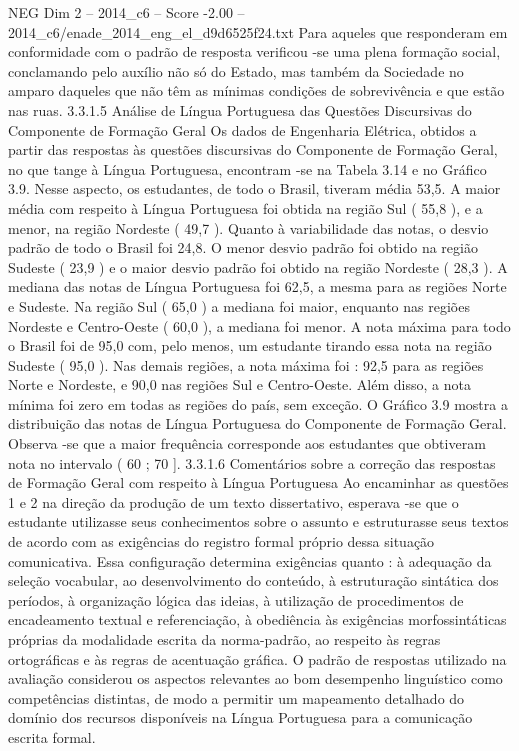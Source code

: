 \begin{textsample}{NEG Dim 2 – 2014\_c6 – Score -2.00 – 2014\_c6/enade\_2014\_eng\_el\_d9d6525f24.txt}
Para aqueles que responderam em conformidade com o padrão de resposta verificou -se uma plena formação social, conclamando pelo auxílio não só do Estado, mas também da Sociedade no amparo daqueles que não têm as mínimas condições de sobrevivência e que estão nas ruas. 3.3.1.5 Análise de Língua Portuguesa das Questões Discursivas do Componente de Formação Geral Os dados de Engenharia Elétrica, obtidos a partir das respostas às questões discursivas do Componente de Formação Geral, no que tange à Língua Portuguesa, encontram -se na Tabela 3.14 e no Gráfico 3.9.
Nesse aspecto, os estudantes, de todo o Brasil, tiveram média 53,5.
A maior média com respeito à Língua Portuguesa foi obtida na região Sul ( 55,8 ), e a menor, na região Nordeste ( 49,7 ).
Quanto à variabilidade das notas, o desvio padrão de todo o Brasil foi 24,8.
O menor desvio padrão foi obtido na região Sudeste ( 23,9 ) e o maior desvio padrão foi obtido na região Nordeste ( 28,3 ).
A mediana das notas de Língua Portuguesa foi 62,5, a mesma para as regiões Norte e Sudeste.
Na região Sul ( 65,0 ) a mediana foi maior, enquanto nas regiões Nordeste e Centro-Oeste ( 60,0 ), a mediana foi menor.
A nota máxima para todo o Brasil foi de 95,0 com, pelo menos, um estudante tirando essa nota na região Sudeste ( 95,0 ).
Nas demais regiões, a nota máxima foi : 92,5 para as regiões Norte e Nordeste, e 90,0 nas regiões Sul e Centro-Oeste.
Além disso, a nota mínima foi zero em todas as regiões do país, sem exceção.
O Gráfico 3.9 mostra a distribuição das notas de Língua Portuguesa do Componente de Formação Geral.
Observa -se que a maior frequência corresponde aos estudantes que obtiveram nota no intervalo ( 60 ; 70 ]. 3.3.1.6 Comentários sobre a correção das respostas de Formação Geral com respeito à Língua Portuguesa Ao encaminhar as questões 1 e 2 na direção da produção de um texto dissertativo, esperava -se que o estudante utilizasse seus conhecimentos sobre o assunto e estruturasse seus textos de acordo com as exigências do registro formal próprio dessa situação comunicativa.
Essa configuração determina exigências quanto : à adequação da seleção vocabular, ao desenvolvimento do conteúdo, à estruturação sintática dos períodos, à organização lógica das ideias, à utilização de procedimentos de encadeamento textual e referenciação, à obediência às exigências morfossintáticas próprias da modalidade escrita da norma-padrão, ao respeito às regras ortográficas e às regras de acentuação gráfica.
O padrão de respostas utilizado na avaliação considerou os aspectos relevantes ao bom desempenho linguístico como competências distintas, de modo a permitir um mapeamento detalhado do domínio dos recursos disponíveis na Língua Portuguesa para a comunicação escrita formal.

\end{textsample}
